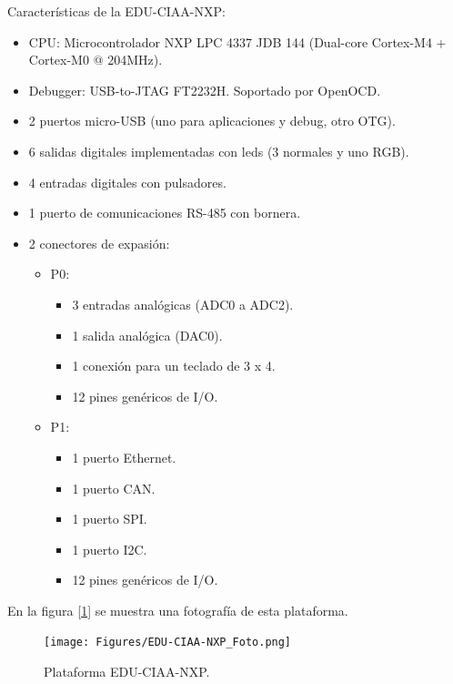 \medskip

\noindent Características de la EDU-CIAA-NXP:

\begin{itemize}
\item
CPU: Microcontrolador NXP LPC 4337 JDB 144 (Dual-core Cortex-M4 + Cortex-M0 @ 204MHz).
\item
Debugger: USB-to-JTAG FT2232H. Soportado por OpenOCD.
\item
2 puertos micro-USB (uno para aplicaciones y debug, otro OTG).
\item
6 salidas digitales implementadas con leds (3 normales y uno RGB).
\item
4 entradas digitales con pulsadores.
\item
1 puerto de comunicaciones RS-485 con bornera.
\item
2 conectores de expasión:
   \begin{itemize}
   \item
   P0:
      \begin{itemize}
      \item
      3 entradas analógicas (ADC0 a ADC2).
      \item
      1 salida analógica (DAC0).
      \item
      1 conexión para un teclado de 3 x 4.
      \item
      12 pines genéricos de I/O.
      \end{itemize}
   \item
   P1:
      \begin{itemize}
      \item
      1 puerto Ethernet.
      \item
      1 puerto CAN.
      \item
      1 puerto SPI.
      \item
      1 puerto I2C.
      \item
      12 pines genéricos de I/O.
      \end{itemize}
   \end{itemize}
\end{itemize}

\noindent En la figura [\ref{fig:eduCiaa}] se muestra una fotografía de esta plataforma.

\begin{figure}[!htbp]
\begin{center}  %
\texttt{[image: Figures/EDU-CIAA-NXP\_Foto.png]}
\par\caption{Plataforma EDU-CIAA-NXP.}\label{fig:eduCiaa}
\end{center}
\end{figure}

